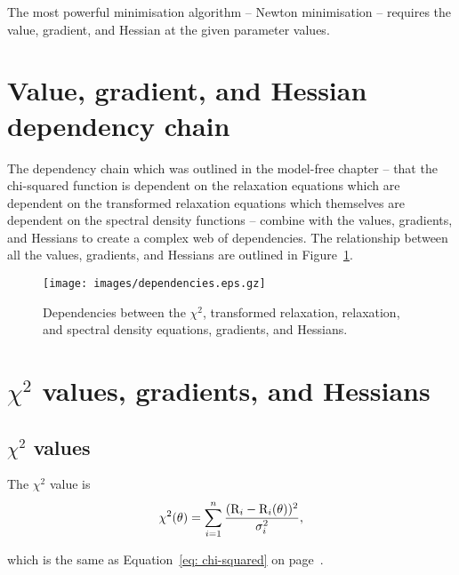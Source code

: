 The most powerful minimisation algorithm -- Newton minimisation -- requires the value, gradient, and Hessian at the given parameter values.




\section{Value, gradient, and Hessian dependency chain}

The dependency chain which was outlined in the model-free chapter -- that the chi-squared function is dependent on the relaxation equations which are dependent on the transformed relaxation equations which themselves are dependent on the spectral density functions -- combine with the values, gradients, and Hessians to create a complex web of dependencies.  The relationship between all the values, gradients, and Hessians are outlined in Figure~\ref{fig: dependencies}.

\begin{figure}[!h]
\centerline{\texttt{[image: images/dependencies.eps.gz]}}
\caption[$\chi^2$ dependencies of the values, gradients, and Hessians]{Dependencies between the $\chi^2$, transformed relaxation, relaxation, and spectral density equations, gradients, and Hessians.}\label{fig: dependencies}
\end{figure}




\section{$\chi^2$ values, gradients, and Hessians}

\subsection{$\chi^2$ values}

The $\chi^2$ value is
\begin{equation}
 \chi^2(\theta) = \sum_{i=1}^n \frac{(\mathrm{R}_i - \mathrm{R}_i(\theta))^2}{\sigma_i^2},
\end{equation}

\noindent which is the same as Equation~\eqref{eq: chi-squared} on page~\pageref{eq: chi-squared}.


